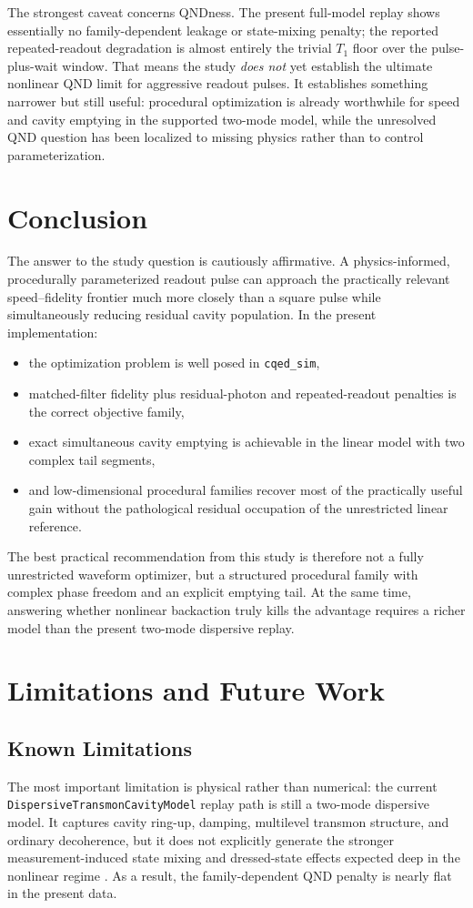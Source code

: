 \documentclass[11pt, a4paper]{article}
\begin{document}
The strongest caveat concerns QNDness. The present full-model replay shows essentially no
family-dependent leakage or state-mixing penalty; the reported repeated-readout degradation
is almost entirely the trivial $T_1$ floor over the pulse-plus-wait window. That means the
study \emph{does not} yet establish the ultimate nonlinear QND limit for aggressive
readout pulses. It establishes something narrower but still useful: procedural optimization
is already worthwhile for speed and cavity emptying in the supported two-mode model, while
the unresolved QND question has been localized to missing physics rather than to control
parameterization.

\section{Conclusion}
The answer to the study question is cautiously affirmative. A physics-informed,
procedurally parameterized readout pulse can approach the practically relevant
speed--fidelity frontier much more closely than a square pulse while simultaneously
reducing residual cavity population. In the present implementation:
\begin{itemize}
  \item the optimization problem is well posed in \texttt{cqed\_sim},
  \item matched-filter fidelity plus residual-photon and repeated-readout penalties is the
  correct objective family,
  \item exact simultaneous cavity emptying is achievable in the linear model with two
  complex tail segments,
  \item and low-dimensional procedural families recover most of the practically useful gain
  without the pathological residual occupation of the unrestricted linear reference.
\end{itemize}
The best practical recommendation from this study is therefore not a fully unrestricted
waveform optimizer, but a structured procedural family with complex phase freedom and an
explicit emptying tail. At the same time, answering whether nonlinear backaction truly
kills the advantage requires a richer model than the present two-mode dispersive replay.

\section{Limitations and Future Work}

\subsection{Known Limitations}
The most important limitation is physical rather than numerical: the current
\texttt{DispersiveTransmonCavityModel} replay path is still a two-mode dispersive model.
It captures cavity ring-up, damping, multilevel transmon structure, and ordinary
decoherence, but it does not explicitly generate the stronger measurement-induced state
mixing and dressed-state effects expected deep in the nonlinear regime
\cite{sank2016measurement}. As a result, the family-dependent QND penalty is nearly flat in
the present data.
\end{document}
